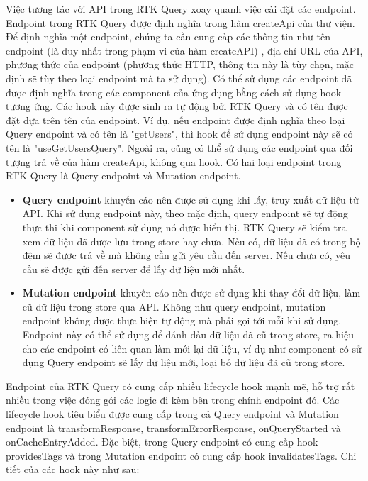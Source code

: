 \tab \tab Việc tương tác với API trong RTK Query xoay quanh việc cài đặt các endpoint.
Endpoint trong RTK Query được định nghĩa trong hàm createApi của thư viện.
Để định nghĩa một endpoint, chúng ta cần cung cấp các thông tin như tên endpoint (là duy nhất trong phạm vi của hàm createAPI) , địa chỉ URL của API, phương thức của endpoint (phương thức HTTP, thông tin này là tùy chọn, mặc định sẽ tùy theo loại endpoint mà ta sử dụng).
Có thể sử dụng các endpoint đã được định nghĩa trong các component của ứng dụng bằng cách sử dụng hook tương ứng.
Các hook này được sinh ra tự động bởi RTK Query và có tên được đặt dựa trên tên của endpoint.
Ví dụ, nếu endpoint được định nghĩa theo loại Query endpoint và có tên là "getUsers", thì hook để sử dụng endpoint này sẽ có tên là "useGetUsersQuery".
Ngoài ra, cũng có thể sử dụng các endpoint  qua đối tượng trả về của hàm createApi, không qua hook.
Có hai loại endpoint trong RTK Query là Query endpoint và Mutation endpoint.

\begin{itemize}
      \item \textbf{Query endpoint} khuyến cáo nên được sử dụng khi lấy, truy xuất dữ liệu từ API.
            Khi sử dụng endpoint này, theo mặc định, query endpoint sẽ tự động thực thi khi component sử dụng nó được hiển thị.
            RTK Query sẽ kiểm tra xem dữ liệu đã được lưu trong store hay chưa.
            Nếu có, dữ liệu đã có trong bộ đệm sẽ được trả về mà không cần gửi yêu cầu đến server.
            Nếu chưa có, yêu cầu sẽ được gửi đến server để lấy dữ liệu mới nhất.
      \item \textbf{Mutation endpoint} khuyến cáo nên được sử dụng khi thay đổi dữ liệu, làm cũ dữ liệu trong store qua API.
            Không như query endpoint, mutation endpoint không được thực hiện tự động mà phải gọi tới mỗi khi sử dụng.
            Endpoint này có thể sử dụng để đánh dấu dữ liệu đã cũ trong store, ra hiệu cho các endpoint có liên quan làm mới lại dữ liệu, ví dụ như component có sử dụng Query endpoint sẽ lấy dữ liệu mới, loại bỏ dữ liệu đã cũ trong store.
\end{itemize}

\tab \tab Endpoint của RTK Query có cung cấp nhiều lifecycle hook mạnh mẽ, hỗ trợ rất nhiều trong việc đóng gói các logic đi kèm bên trong chính endpoint đó.
Các lifecycle hook tiêu biểu được cung cấp trong cả Query endpoint và Mutation endpoint là transformResponse,  transformErrorResponse, onQueryStarted và onCacheEntryAdded.
Đặc biệt, trong Query endpoint có cung cấp hook providesTags và trong Mutation endpoint có cung cấp hook invalidatesTags.
Chi tiết của các hook này như sau:

